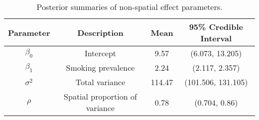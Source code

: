 \begin{table}[ht]
\centering
\begin{tabular}{cccc}
  \hline
Parameter & Description & Mean & 95\% Credible Interval \\ 
  \hline
$\beta_0$ & Intercept & 9.57 & (6.073, 13.205) \\ 
  $\beta_1$ & Smoking prevalence & 2.24 & (2.117, 2.357) \\ 
  $\sigma^2$ & Total variance & 114.47 & (101.506, 131.105) \\ 
  $\rho$ & Spatial proportion of variance & 0.78 & (0.704, 0.86) \\ 
   \hline
\end{tabular}
\caption{Posterior summaries of non-spatial effect parameters.} 
\label{tab:RDA_post_summaries}
\end{table}
